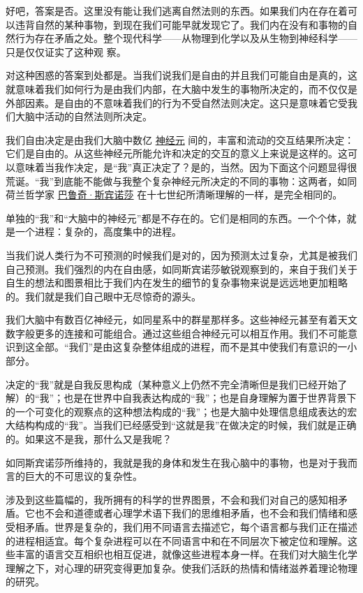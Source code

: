     好吧，答案是否。这里没有能让我们逃离自然法则的东西。如果我们内在存在着可以违背自然的某种事物，到现在我们可能早就发现它了。我们内在没有和事物的自然行为存在矛盾之处。整个现代科学——从物理到化学以及从生物到神经科学——只是仅仅证实了这种观
察。
 
   对这种困惑的答案到处都是。当我们说我们是自由的并且我们可能自由是真的，这就意味着我们如何行为是由我们内部，在大脑中发生的事物所决定的，而不仅仅是外部因素。是自由的不意味着我们的行为不受自然法则决定。这只是意味着它受我们大脑中活动的自然法则所决定。

    我们自由决定是由我们大脑中数亿
\href{http://toyhouse.cc/wiki/index.php/神经元}{神经元}
间的，丰富和流动的交互结果所决定：它们是自由的。从这些神经元所能允许和决定的交互的意义上来说是这样的。这可以意味着当我作决定，是“我”真正决定了？是的，当然。因为下面这个问题显得很荒诞。“我”到底能不能做与我整个复杂神经元所决定的不同的事物：这两者，如同荷兰哲学家
\href{http://toyhouse.cc/wiki/index.php/巴鲁奇·斯宾诺莎}{巴鲁奇·斯宾诺莎}
在十七世纪所清晰理解的一样，是完全相同的。

    单独的“我”和“大脑中的神经元”都是不存在的。它们是相同的东西。一个个体，就是一个进程：复杂的，高度集中的进程。

    当我们说人类行为不可预测的时候我们是对的，因为预测太过复杂，尤其是被我们自己预测。我们强烈的内在自由感，如同斯宾诺莎敏锐观察到的，来自于我们关于自生的想法和图景相比于我们内在发生的细节的复杂事物来说是远远地更加粗略的。我们就是我们自己眼中无尽惊奇的源头。

    我们大脑中有数百亿神经元，如同星系中的群星那样多。这些神经元甚至有着天文数字般更多的连接和可能组合。通过这些组合神经元可以相互作用。我们不可能意识到这全部。“我们”是由这复杂整体组成的进程，而不是其中使我们有意识的一小部分。
 
   决定的“我”就是自我反思构成（某种意义上仍然不完全清晰但是我们已经开始了解）的“我”；也是在世界中自我表达构成的“我”；也是自身理解为置于世界背景下的一个可变化的观察点的这种想法构成的“我”；也是大脑中处理信息组成表达的宏大结构构成的“我”。当我们已经感受到“这就是我”在做决定的时候，我们就是正确的。如果这不是我，那什么又是我呢？

    如同斯宾诺莎所维持的，我就是我的身体和发生在我心脑中的事物，也是对于我而言的巨大的不可思议的复杂性。

    涉及到这些篇幅的，我所拥有的科学的世界图景，不会和我们对自己的感知相矛盾。它也不会和道德或者心理学术语下我们的思维相矛盾，也不会和我们情绪和感受相矛盾。世界是复杂的，我们用不同语言去描述它，每个语言都与我们正在描述的进程相适宜。每个复杂进程可以在不同语言中和在不同层次下被定位和理解。这些丰富的语言交互相织也相互促进，就像这些进程本身一样。在我们对大脑生化学理解之下，对心理的研究变得更加复杂。使我们活跃的热情和情绪滋养着理论物理的研究。

